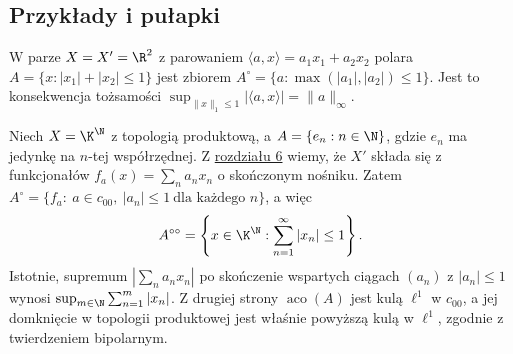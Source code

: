 \subsection{Przykłady i pułapki}

\begin{przyklad}\label{ex:polar-balls}
W parze $X=X'=\R^2$ z parowaniem
$\langle a,x\rangle=a_1x_1+a_2x_2$ polara
$A=\{x:|x_1|+|x_2|\le1\}$ jest zbiorem
$A^\circ=\{a:\max(|a_1|,|a_2|)\le1\}$.
Jest to konsekwencja tożsamości
$\sup_{\|x\|_1\le1}|\langle a,x\rangle|=\|a\|_\infty$.
\begin{center}
\end{center}
\end{przyklad}

\begin{przyklad}\label{ex:polar-product}
Niech $X=\K^\N$ z topologią produktową, a
$A=\{e_n:n\in\N\}$, gdzie $e_n$ ma jedynkę na
$n$-tej współrzędnej. Z \hyperref[sec:hahn-banach]{rozdziału 6} wiemy, że $X'$
składa się z funkcjonałów $f_a(x)=\sum_n a_nx_n$
o skończonym nośniku. Zatem
$A^\circ=\{f_a:\ a\in c_{00},\ |a_n|\le1\ \text{dla każdego }n\}$,
a więc
\[
 A^{\circ\circ}=
 \left\{x\in\K^\N:\sum_{n=1}^\infty|x_n|\le1\right\}.
\]
Istotnie, supremum $|\sum_n a_nx_n|$ po
skończenie wspartych ciągach $(a_n)$ z $|a_n|\le1$
wynosi $\sup_{m\in\N}\sum_{n=1}^m|x_n|$. Z drugiej strony
$\operatorname{aco}(A)$ jest kulą $\ell^1$ w $c_{00}$,
a jej domknięcie w topologii produktowej jest właśnie
powyższą kulą w $\ell^1$, zgodnie z twierdzeniem bipolarnym.
\end{przyklad}

